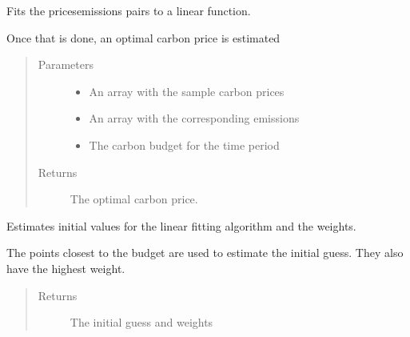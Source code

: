 \documentclass[letterpaper,10pt,english]{sphinxmanual}
\begin{document}
\begin{fulllineitems}
\label{\detokenize{api:muse.carbon_budget.linear}}
Fits the prices\sphinxhyphen{}emissions pairs to a linear function.

Once that is done, an optimal carbon price is estimated
\begin{quote}\begin{description}
\item[{Parameters}] \leavevmode\begin{itemize}
\item {} 
 \textendash{} An array with the sample carbon prices

\item {} 
 \textendash{} An array with the corresponding emissions

\item {} 
 \textendash{} The carbon budget for the time period

\end{itemize}

\item[{Returns}] \leavevmode
The optimal carbon price.

\end{description}\end{quote}

\end{fulllineitems}


\begin{fulllineitems}
\label{\detokenize{api:muse.carbon_budget.linear_guess_and_weights}}
Estimates initial values for the linear fitting algorithm and the
weights.

The points closest to the budget are used to estimate the initial guess. They also
have the highest weight.
\begin{quote}\begin{description}
\item[{Returns}] \leavevmode
The initial guess and weights

\end{description}\end{quote}

\end{fulllineitems}
\end{document}
